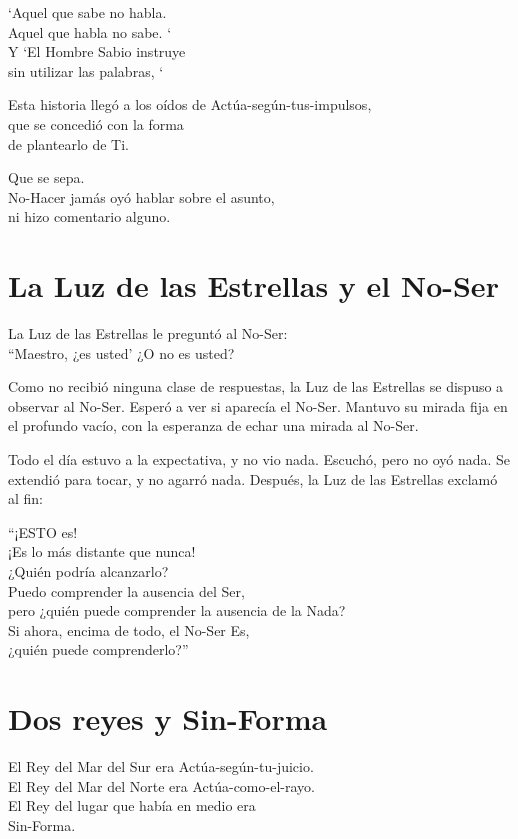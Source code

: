 \documentclass[hidelinks]{memoir}
\begin{document}
	`Aquel que sabe no habla.\\
	Aquel que habla no sabe. `\\
	Y `El Hombre Sabio instruye\\
	sin utilizar las palabras, `
	
	Esta historia llegó a los oídos de Actúa-según-tus-impulsos,\\
	que se concedió con la forma\\
	de plantearlo de Ti.
	
	Que se sepa.\\
	No-Hacer jamás oyó hablar sobre el asunto,\\
	ni hizo comentario alguno.
	
	\chapter*{La Luz de las Estrellas y el No-Ser}
	
	La Luz de las Estrellas le preguntó al No-Ser:\\
	``Maestro, ¿es usted' ¿O no es usted?
	
	Como no recibió ninguna clase de respuestas, la Luz de las Estrellas se
	dispuso a observar al No-Ser. Esperó a ver si aparecía el No-Ser.
	Mantuvo su mirada fija en el profundo vacío, con la esperanza de echar
	una mirada al No-Ser.
	
	Todo el día estuvo a la expectativa, y no vio nada. Escuchó, pero no oyó
	nada. Se extendió para tocar, y no agarró nada. Después, la Luz de las
	Estrellas exclamó al fin:
	
	``¡ESTO es!\\
	¡Es lo más distante que nunca!\\
	¿Quién podría alcanzarlo?\\
	Puedo comprender la ausencia del Ser,\\
	pero ¿quién puede comprender la ausencia de la Nada?\\
	Si ahora, encima de todo, el No-Ser Es,\\
	¿quién puede comprenderlo?''
	
	\chapter*{Dos reyes y Sin-Forma}
	
	El Rey del Mar del Sur era Actúa-según-tu-juicio.\\
	El Rey del Mar del Norte era Actúa-como-el-rayo.\\
	El Rey del lugar que había en medio era\\
	Sin-Forma.
	
\end{document}
